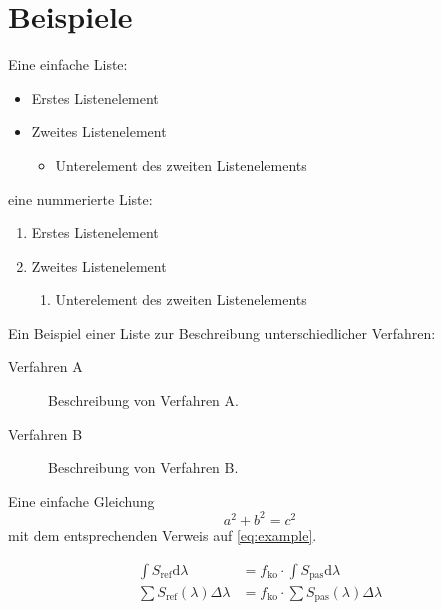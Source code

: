 \chapter[Beispiele]{Beispiele}

Eine einfache Liste:
\begin{itemize}
  \item Erstes Listenelement
  \item Zweites Listenelement
  \begin{itemize}
    \item Unterelement des zweiten Listenelements
  \end{itemize}
\end{itemize}

eine nummerierte Liste:
\begin{enumerate}%
  \item Erstes Listenelement
  \item Zweites Listenelement
  \begin{enumerate}
    \item Unterelement des zweiten Listenelements
  \end{enumerate}
\end{enumerate}

Ein Beispiel einer Liste zur Beschreibung unterschiedlicher Verfahren:
\begin{description}%
  \item[Verfahren A] Beschreibung von Verfahren A.
  \item[Verfahren B] Beschreibung von Verfahren B.
\end{description}

\noindent Eine einfache Gleichung
\begin{equation}
    a^2 + b^2 = c^2
    \label{eq:example}
\end{equation}
mit dem entsprechenden Verweis auf \ref{eq:example}.

\begin{subequations} 
  \begin{align}
      \int S_\mathrm{ref}\mathrm{d}\lambda &= f_\mathrm{ko} \cdot \int S_\mathrm{pas}\mathrm{d}\lambda \label{eq:referencefactor1} \\
      \sum S_\mathrm{ref}(\lambda)\Delta\lambda &= f_\mathrm{ko} \cdot \sum S_\mathrm{pas}(\lambda)\Delta\lambda \label{eq:referencefactor2}
  \end{align}
\end{subequations}

